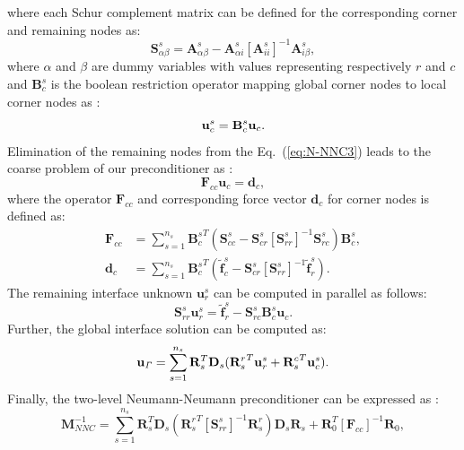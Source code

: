 \documentclass{article}
\begin{document}
where each Schur complement matrix can be defined for the corresponding corner and remaining nodes as:
\begin{equation}\label{eq:Schur_alphabeta}
\mathbf{S}^s_{\alpha \beta} = \mathbf{A}^s_{\alpha \beta} - \mathbf{A}^s_{\alpha i} [\mathbf{A}^s_{ii}]^{-1} \mathbf{A}^s_{i\beta},
\end{equation}
where $\alpha$ and $\beta$ are dummy variables with values representing respectively $r$ and $c$ and $\mathbf{B}_c^s$ is the boolean restriction operator mapping global corner nodes to local corner nodes as \cite{subber_thesis}:
\begin{equation}
{\bf{u}}_c ^{s}= {\bf{B}}_c ^{s} {\bf{u}}_c.
\end{equation}
Elimination of the remaining nodes from the Eq.~(\ref{eq:N-NNC3}) leads to the coarse problem of our preconditioner as \cite{subber_thesis}:
\begin{equation}\label{eq:coarsegrid}
\mathbf{F}_{cc} \mathbf{u}_c = \mathbf{d}_c,
\end{equation}
where the operator $\mathbf{F}_{cc}$ and corresponding force vector $\mathbf{d}_{c}$ for corner nodes is defined as:
\begin{align}\label{eq:Fcc}
\mathbf{F}_{cc} &= \sum_{s=1}^{n_s} {\mathbf{B}_c^s}^T (\mathbf{S}_{cc}^s - \mathbf{S}_{cr}^s [\mathbf{S}_{rr}^s]^{-1} \mathbf{S}_{rc}^s)\mathbf{B}_c^s, \\
\mathbf{d}_{c} &= \sum_{s=1}^{n_s} {\mathbf{B}_c^s}^T (\tilde{\mathbf{f}}^s_c - \mathbf{S}_{cr}^s [\mathbf{S}_{rr}^s]^{-1} \tilde{\mathbf{f}}^s_r).
\end{align}
The remaining interface unknown $\mathbf{u}_r^s$ can be computed in parallel as follows:
\begin{equation}\label{eq:urs}
\mathbf{S}^s_{rr} \mathbf{u}_r^s = \tilde{\mathbf{f}}^s_r  - \mathbf{S}^s_{rc} \mathbf{B}_c^s \mathbf{u}_c.
\end{equation}
Further, the global interface solution can be computed as:
\begin{equation}\label{eq:ugb}
\mathbf{u}_{\it\Gamma} =  \sum_{s=1}^{n_s}  \mathbf{R}_{s}^{T} \mathbf{D}_{s} ({\mathbf{R}^{r}_{s}}^{T} \mathbf{u}_{r}^{s} + {\mathbf{R}_{s}^c}^{T} \mathbf{u}^s_c).
\end{equation}
Finally, the two-level Neumann-Neumann preconditioner can be expressed as \cite{subber_thesis}:
\begin{equation}\label{eq:NNCP}
\mathbf{M}_{NNC}^{-1} = \sum_{s=1}^{n_s} \mathbf{R}_s^T \mathbf{D}_s({\mathbf{R}_s^r}^T [\mathbf{S}^s_{rr}]^{-1} \mathbf{R}_s^r) \mathbf{D}_s \mathbf{R}_s  + \mathbf{R}_0^T [\mathbf{F}_{cc}]^{-1} \mathbf{R}_0,
\end{equation}
\end{document}
